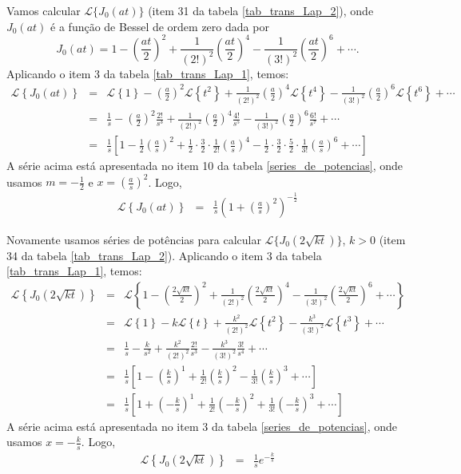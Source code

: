 \begin{ex}Vamos calcular $\mathcal{L}\{J_0(at)\}$ (item 31 da tabela \ref{tab_trans_Lap_2}), onde $J_0(at)$ é a função de Bessel de ordem zero dada por
$$
J_0(at)=1-\left(\frac{at}{2}\right)^2+\frac{1}{(2!)^2}\left(\frac{at}{2}\right)^4-\frac{1}{(3!)^2}\left(\frac{at}{2}\right)^6+\cdots.
$$
Aplicando o item 3 da tabela \ref{tab_trans_Lap_1}, temos:
\begin{eqnarray*}
\mathcal{L}\left\{J_0(at)\right\}&=&\mathcal{L}\left\{1\right\}-\left(\frac{a}{2}\right)^2\mathcal{L}\left\{t^2\right\}+\frac{1}{(2!)^2}\left(\frac{a}{2}\right)^4\mathcal{L}\left\{t^4\right\}-\frac{1}{(3!)^2}\left(\frac{a}{2}\right)^6\mathcal{L}\left\{t^6\right\}+\cdots\\
&=&\frac{1}{s}-\left(\frac{a}{2}\right)^2\frac{2!}{s^3}+\frac{1}{(2!)^2}\left(\frac{a}{2}\right)^4\frac{4!}{s^5}-\frac{1}{(3!)^2}\left(\frac{a}{2}\right)^6\frac{6!}{s^7}+\cdots\\
&=&\frac{1}{s}\left[1-\frac{1}{2}\left(\frac{a}{s}\right)^2+\frac{1}{2}\cdot \frac{3}{2}\cdot \frac{1}{2!}\left(\frac{a}{s}\right)^4-\frac{1}{2}\cdot\frac{3}{2}\cdot \frac{5}{2}\cdot\frac{1}{3!} \left(\frac{a}{s}\right)^6+\cdots\right]
\end{eqnarray*}
A série acima está apresentada no item 10 da tabela \ref{series_de_potencias}, onde usamos $m=-\frac{1}{2}$ e $x=\left(\frac{a}{s}\right)^2$. Logo,
\begin{eqnarray*}
\mathcal{L}\left\{J_0(at)\right\}&=&\frac{1}{s}\left(1+\left(\frac{a}{s}\right)^2\right)^{-\frac{1}{2}}
\end{eqnarray*}
\end{ex}
\begin{ex}Novamente usamos séries de potências para calcular $\mathcal{L}\{J_0(2\sqrt{kt})\}$, $k>0$ (item 34 da tabela \ref{tab_trans_Lap_2}). Aplicando o item 3 da tabela \ref{tab_trans_Lap_1}, temos:
\begin{eqnarray*}
\mathcal{L}\left\{J_0(2\sqrt{kt})\right\}&=&\mathcal{L}\left\{1-\left(\frac{2\sqrt{kt}}{2}\right)^2+\frac{1}{(2!)^2}\left(\frac{2\sqrt{kt}}{2}\right)^4-\frac{1}{(3!)^2}\left(\frac{2\sqrt{kt}}{2}\right)^6+\cdots\right\}\\
&=&\mathcal{L}\left\{1\right\}-k\mathcal{L}\left\{t\right\}+\frac{k^2}{(2!)^2}\mathcal{L}\left\{t^2\right\}-\frac{k^3}{(3!)^2}\mathcal{L}\left\{t^3\right\}+\cdots\\
&=&\frac{1}{s}-\frac{k}{s^2}+\frac{k^2}{(2!)^2}\frac{2!}{s^3}-\frac{k^3}{(3!)^2}\frac{3!}{s^4}+\cdots\\
&=&\frac{1}{s}\left[1-\left(\frac{k}{s}\right)^1+\frac{1}{2!}\left(\frac{k}{s}\right)^2-\frac{1}{3!}\left(\frac{k}{s}\right)^3+\cdots\right]\\
&=&\frac{1}{s}\left[1+\left(-\frac{k}{s}\right)^1+\frac{1}{2!}\left(-\frac{k}{s}\right)^2+\frac{1}{3!}\left(-\frac{k}{s}\right)^3+\cdots\right]
\end{eqnarray*}
A série acima está apresentada no item 3 da tabela \ref{series_de_potencias}, onde usamos $x=-\frac{k}{s}$. Logo,
\begin{eqnarray*}
\mathcal{L}\left\{J_0(2\sqrt{kt})\right\}&=&\frac{1}{s}e^{-\frac{k}{s}}
\end{eqnarray*}
\end{ex}
